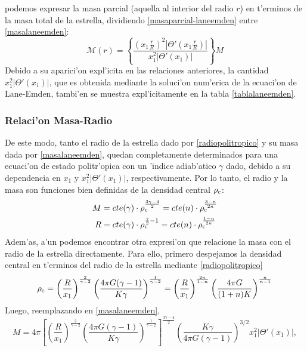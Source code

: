 podemos expresar la masa parcial (aquella al interior del radio $r$) en t'erminos de la masa total de la estrella, dividiendo \eqref{masaparcial-laneemden} entre \eqref{masalaneemden}:
\begin{equation}\label{masapoli-en-r}
\mathcal{M}(r)=\left\{\frac{\left(x_1\frac{r}{R}\right)^2\left|\Theta'\left(x_1\frac{r}{R}\right)\right|}{x_1^2\left|\Theta'(x_1)\right|}\right\}M
\end{equation}
Debido a su aparici'on expl'icita en las relaciones anteriores, la cantidad $x_1^2\left|\Theta'(x_1)\right|$, que es obtenida mediante la soluci'on num'erica de la ecuaci'on de Lane-Emden, tambi'en se muestra expl'icitamente en la tabla \ref{tablalaneemden}.

\subsubsection{Relaci'on Masa-Radio}
De este modo, tanto el radio de la  estrella dado por \eqref{radiopolitropico} y su masa dada por \eqref{masalaneemden}, quedan completamente determinados para una ecuaci'on de estado politr'opica con un 'indice adiab'atico $\gamma$ dado, debido a su dependencia en $x_1$ y $x_1^2\left|\Theta'(x_1)\right|$, respectivamente. Por lo tanto, el radio y la masa son funciones bien definidas de la densidad central $\rho_{\rm c}$:
\begin{align}
M&=cte(\gamma)\cdot\rho_{\rm c}^{\frac{3\gamma-4}{2}}=cte(n)\cdot\rho_{\rm c}^{\frac{3-n}{2n}}\label{lane-masagamma}\\
R&=cte(\gamma)\cdot\rho_{\rm c}^{\frac{\gamma}{2}-1}=cte(n)\cdot\rho_{\rm c}^{\frac{1-n}{2n}}\label{lane-radiogamma}
\end{align}
Adem'as, a'un podemos encontrar otra expresi'on que relacione la masa con el radio de la estrella directamente. Para ello, primero despejamos la densidad central en t'erminos del radio de la estrella mediante \eqref{radiopolitropico}
\begin{equation}
 \rho_{\rm c}=\left(\frac{R}{x_1}\right)^{\frac{2}{\gamma-2}}\left(\frac{4\pi G(\gamma-1)}{K\gamma}\right)^{\frac{1}{\gamma-2}}=\left(\frac{R}{x_1}\right)^{\frac{2n}{1-n}}\left(\frac{4\pi G}{(1+n)K}\right)^{\frac{n}{n-1}}
\end{equation}
Luego, reemplazando en \eqref{masalaneemden},
\begin{equation}
 M=4\pi\left[\left(\frac{R}{x_1}\right)^{\frac{2}{\gamma-2}}\left(\frac{4\pi G(\gamma-1)}{K\gamma}\right)^{\frac{1}{\gamma-2}}\right]^{\frac{3\gamma-4}{2}}\left(\frac{K\gamma}{4\pi G(\gamma-1)}\right)^{3/2}x_1^2\left|\Theta'(x_1)\right|,
\end{equation}
